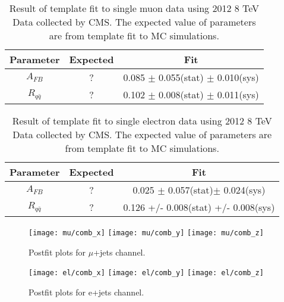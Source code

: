 \documentclass{cmspaperpdf}
\begin{document}
\begin{table}[hbt]
\begin{center}
\begin{tabular}{c|cc}\hline
Parameter                 & Expected  & Fit   \\
\hline
$A_{FB}$					  & ?  &  0.085 $\pm$ 0.055(stat) $\pm$ 0.010(sys) \\
$R_{q\bar{q}}$			  & ? &  0.102 $\pm$ 0.008(stat) $\pm$ 0.011(sys) \\
\end{tabular}
\end{center}
\label{tab:result_mu}
\caption{Result of template fit to single muon data using 2012 8 TeV Data collected by CMS.  The expected value of parameters are from template fit to MC simulations. }
\end{table}

\begin{table}[hbt]
\begin{center}
\begin{tabular}{c|cc}\hline
Parameter                  & Expected  & Fit   \\
\hline
$A_{FB}$					 &	?	& 0.025 $\pm$ 0.057(stat)$\pm$ 0.024(sys) \\
$R_{q\bar{q}}$	& ? &  0.126 +/- 0.008(stat) +/- 0.008(sys)   \\
\end{tabular}
\end{center}
\label{tab:result_el}
\caption{Result of template fit to single electron data using 2012 8 TeV Data collected by CMS. The expected value of parameters are from template fit to MC simulations. }
\end{table}

\begin{figure}[hbt]
  \begin{center}
    \texttt{[image: mu/comb\_x]}
    \texttt{[image: mu/comb\_y]}
    \texttt{[image: mu/comb\_z]}
  \caption{\small Postfit plots for $\mu$+jets channel.}
    \label{fig:el_postfit}
  \end{center}
\end{figure}

\begin{figure}[hbt]
  \begin{center}
    \texttt{[image: el/comb\_x]}
    \texttt{[image: el/comb\_y]}
    \texttt{[image: el/comb\_z]}
  \caption{\small Postfit plots for e+jets channel.}
    \label{fig:el_postfit}
  \end{center}
\end{figure}
\end{document}
